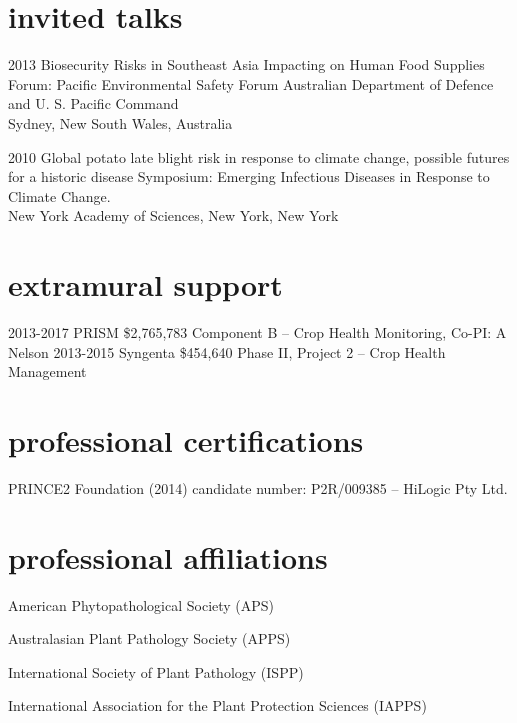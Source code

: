 \documentclass[]{friggeri-cv}
\begin{document}
\begin{refsection}
  \nocite{*}
  \printbibliography[sorting=chronological, type=inreview, title={in review}, heading=subbibliography]
\end{refsection}
\begin{refsection}
  \nocite{*}
  \printbibliography[sorting=chronological, type=inproceedings, title={conferences/proceedings},  heading=subbibliography]
\end{refsection}
\begin{refsection}
  \nocite{*}
  \printbibliography[sorting=chronological, type=inbook, title={book chapters}, heading=subbibliography]
\end{refsection}
\begin{refsection}
  \nocite{*}
  \printbibliography[sorting=chronological, type=report, title={reports}, heading=subbibliography]
\end{refsection}

\section{invited talks}
\begin{entrylist}
\entry
{2013}
{Biosecurity Risks in Southeast Asia Impacting on Human Food Supplies}
{}
{Forum: Pacific Environmental Safety Forum Australian Department of Defence and U. S. Pacific Command\\Sydney, New South Wales, Australia}

\entry
{2010} 
{Global potato late blight risk in response to climate change, possible futures for a historic disease}
{}
{Symposium: Emerging Infectious Diseases in Response to Climate Change.\\New York Academy of Sciences, New York, New York}
\end{entrylist}

\section{extramural support}
  \begin{entrylist}
  \entry
	{2013-2017}
	{PRISM }
	{\$2,765,783}
	{Component B -- Crop Health Monitoring, Co-PI: A Nelson}
  \entry
	{2013-2015}
	{Syngenta}
	{\$454,640}
	{Phase II, Project 2 -- Crop Health Management}
  \end{entrylist}


\section{professional certifications}
PRINCE2 Foundation (2014) candidate number: P2R/009385 – HiLogic  Pty Ltd.

\section{professional affiliations}
American Phytopathological Society (APS)

Australasian Plant Pathology Society (APPS) 

International Society of Plant Pathology (ISPP)

International Association for the Plant Protection Sciences (IAPPS)
\end{document}
